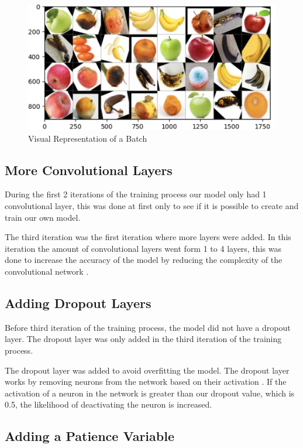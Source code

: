 \documentclass[conference]{IEEEtran}
\begin{document}
\begin{figure}[h]
    \centering
    \includegraphics[width=\linewidth]{Batch_Representation.jpg}
    \caption{Visual Representation of a Batch}
    \label{fig4}
\end{figure}

\subsection{More Convolutional Layers}

During the first 2 iterations of the training process our model only had 1 convolutional layer, this was done at first only to see if it is possible to create and train our own model. 

The third iteration was the first iteration where more layers were added. In this iteration the amount of convolutional layers went form 1 to 4 layers, this was done to increase the accuracy of the model by reducing the complexity of the convolutional network \cite{b3}.

\subsection{Adding Dropout Layers}

Before third iteration of the training process, the model did not have a dropout layer. The dropout layer was only added in the third iteration of the training process.

The dropout layer was added to avoid overfitting the model. The dropout layer works by removing neurons from the network based on their activation \cite{b5}. If the activation of a neuron in the network is greater than our dropout value, which is 0.5, the likelihood of deactivating the neuron is increased.

\subsection{Adding a Patience Variable}
\end{document}
